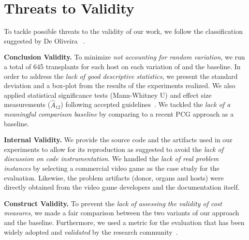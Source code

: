 \section{Threats to Validity}
\label{sec:Threats}

To tackle possible threats to the validity of our work, we follow the classification suggested by De Oliveira \etal~\cite{oliveira2011threats}.

\textbf{Conclusion Validity.}
To minimize \textit{not accounting for random variation}, we run a total of 645 transplants for each host on each variation of \ApproachName{} and the baseline.
In order to address the \textit{lack of good descriptive statistics}, we present the standard deviation and a box-plot from the results of the experiments realized. We also applied statistical significance tests (Mann-Whitney U) and effect size measurements ($\hat{A}_{12}$) following accepted guidelines~\cite{arcuri2013parameter}.
We tackled the \textit{lack of a meaningful comparison baseline} by comparing \ApproachName{} to a recent PCG approach as a baseline. 


\textbf{Internal Validity.}
We provide the source code and the artifacts used in our experiments to allow for its reproduction as suggested to avoid the \textit{lack of discussion on code instrumentation}.
We handled the \textit{lack of real problem instances} by selecting a commercial video game as the case study for the evaluation. Likewise, the problem artifacts (donor, organs and hosts) were directly obtained from the video game developers and the documentation itself. 

\textbf{Construct Validity.}
To prevent the \textit{lack of assessing the validity of cost measures}, we made a fair comparison between the two variants of our approach and the baseline. Furthermore, we used a metric for the evaluation that has been widely adopted and \textit{validated} by the research community~\cite{browne2010evolutionary}.


